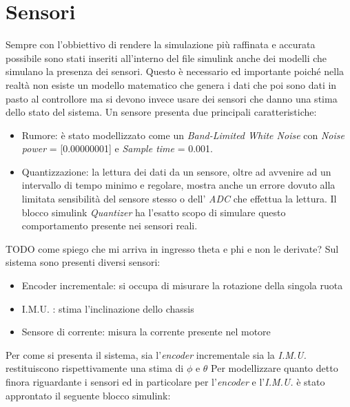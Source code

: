 \section{Sensori}
Sempre con l'obbiettivo di rendere la simulazione più raffinata e accurata possibile sono stati inseriti all'interno del file simulink anche dei modelli che simulano la presenza dei sensori. Questo è necessario ed importante poiché nella realtà non esiste un modello matematico che genera i dati che poi sono dati in pasto al controllore ma si devono invece usare dei sensori che danno una stima dello stato del sistema. Un sensore presenta due principali caratteristiche: 
\begin{itemize}
	\item Rumore: è stato modellizzato come un \textit{Band-Limited
		White Noise} con \textit{Noise power} = [0.00000001] e \textit{Sample time} = 0.001.
	\item Quantizzazione: la lettura dei dati da un sensore, oltre ad avvenire ad un intervallo di tempo minimo e regolare, mostra anche un errore dovuto alla limitata sensibilità del sensore stesso o dell' \textit{ADC} che effettua la lettura. Il blocco simulink \textit{Quantizer} ha l'esatto scopo di simulare questo comportamento presente nei sensori reali.
\end{itemize}
TODO come spiego che mi arriva in ingresso theta e phi e non le derivate?
Sul sistema sono presenti diversi sensori:
\begin{itemize}
	\item Encoder incrementale: si occupa di misurare la rotazione della singola ruota
	\item I.M.U. : stima l'inclinazione dello chassis
	\item Sensore di corrente: misura la corrente presente nel motore
\end{itemize}
Per come si presenta il sistema, sia l'\textit{encoder} incrementale sia la \textit{I.M.U.} restituiscono rispettivamente una stima di $\phi$ e $\theta$
Per modellizzare quanto detto finora riguardante i sensori ed in particolare per l'\textit{encoder} e l'\textit{I.M.U.} è stato approntato il seguente blocco simulink:
